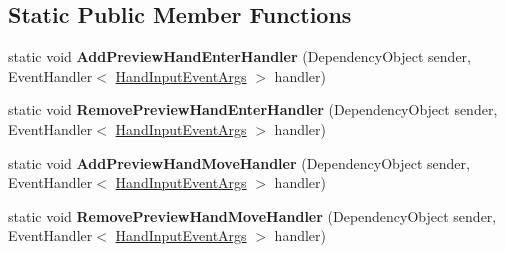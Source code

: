 \subsection*{Static Public Member Functions}
\begin{DoxyCompactItemize}
\item 
\hypertarget{class_microsoft_1_1_samples_1_1_kinect_1_1_basic_interactions_1_1_kinect_controller_aa2a1bed99cc6e59146383ca5e3015a4a}{static void {\bfseries Add\-Preview\-Hand\-Enter\-Handler} (Dependency\-Object sender, Event\-Handler$<$ \hyperlink{class_microsoft_1_1_samples_1_1_kinect_1_1_basic_interactions_1_1_hand_input_event_args}{Hand\-Input\-Event\-Args} $>$ handler)}\label{class_microsoft_1_1_samples_1_1_kinect_1_1_basic_interactions_1_1_kinect_controller_aa2a1bed99cc6e59146383ca5e3015a4a}

\item 
\hypertarget{class_microsoft_1_1_samples_1_1_kinect_1_1_basic_interactions_1_1_kinect_controller_ad98da63bb62282190e1f419c673c2a96}{static void {\bfseries Remove\-Preview\-Hand\-Enter\-Handler} (Dependency\-Object sender, Event\-Handler$<$ \hyperlink{class_microsoft_1_1_samples_1_1_kinect_1_1_basic_interactions_1_1_hand_input_event_args}{Hand\-Input\-Event\-Args} $>$ handler)}\label{class_microsoft_1_1_samples_1_1_kinect_1_1_basic_interactions_1_1_kinect_controller_ad98da63bb62282190e1f419c673c2a96}

\item 
\hypertarget{class_microsoft_1_1_samples_1_1_kinect_1_1_basic_interactions_1_1_kinect_controller_a7f31225799bb353431f9cbe194685c54}{static void {\bfseries Add\-Preview\-Hand\-Move\-Handler} (Dependency\-Object sender, Event\-Handler$<$ \hyperlink{class_microsoft_1_1_samples_1_1_kinect_1_1_basic_interactions_1_1_hand_input_event_args}{Hand\-Input\-Event\-Args} $>$ handler)}\label{class_microsoft_1_1_samples_1_1_kinect_1_1_basic_interactions_1_1_kinect_controller_a7f31225799bb353431f9cbe194685c54}

\item 
\hypertarget{class_microsoft_1_1_samples_1_1_kinect_1_1_basic_interactions_1_1_kinect_controller_aeb55d56ea91e8053a6fd9dc89614d23d}{static void {\bfseries Remove\-Preview\-Hand\-Move\-Handler} (Dependency\-Object sender, Event\-Handler$<$ \hyperlink{class_microsoft_1_1_samples_1_1_kinect_1_1_basic_interactions_1_1_hand_input_event_args}{Hand\-Input\-Event\-Args} $>$ handler)}\label{class_microsoft_1_1_samples_1_1_kinect_1_1_basic_interactions_1_1_kinect_controller_aeb55d56ea91e8053a6fd9dc89614d23d}


\end{DoxyCompactItemize}
